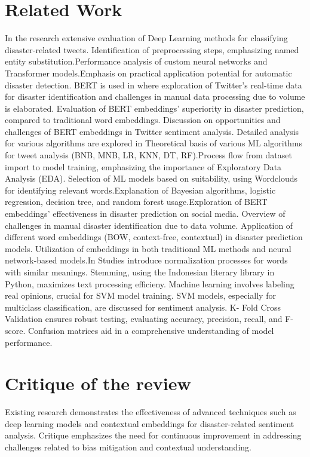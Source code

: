 \section{Related Work} 
In the research \cite{chanda2021efficacy} extensive evaluation of Deep Learning methods for 
classifying disaster-related tweets. Identification of preprocessing steps, emphasizing named 
entity substitution.Performance analysis of custom neural networks and Transformer 
models.Emphasis on practical application potential for automatic disaster detection. BERT is 
used in \cite{deb2022comparative} where exploration of Twitter's real-time data for disaster 
identification and challenges in manual data processing due to volume is elaborated. Evaluation 
of BERT embeddings' superiority in disaster prediction, compared to traditional word 
embeddings. Discussion on opportunities and challenges of BERT embeddings in Twitter sentiment 
analysis. Detailed analysis for various algorithms are explored in 
\cite{fontalis2023comparative} Theoretical basis of various ML algorithms for tweet analysis 
(BNB, MNB, LR, KNN, DT, RF).Process flow from dataset import to model training, emphasizing the 
importance of Exploratory Data Analysis (EDA).
Selection of ML models based on suitability, using Wordclouds for identifying relevant 
words.Explanation of Bayesian algorithms, logistic regression, decision tree, and random forest 
usage.\cite{iparraguirre2023classification}Exploration of BERT embeddings' effectiveness in 
disaster prediction on social media. Overview of challenges in manual disaster identification 
due to data volume. Application of different word embeddings (BOW, context-free, contextual) in 
disaster prediction models.
Utilization of embeddings in both traditional ML methods and neural network-based models.In 
\cite{saddam2023sentiment}Studies introduce normalization processes for words with similar 
meanings. Stemming, using the Indonesian literary library in Python, maximizes text processing 
efficieny. Machine learning involves labeling real opinions, crucial for SVM model training.
SVM models, especially for multiclass classification, are discussed for sentiment analysis. K-
Fold Cross Validation ensures robust testing, evaluating accuracy, precision, recall, and F-
score. Confusion matrices aid in a comprehensive understanding of model performance.

\section{Critique of the review} %
Existing research demonstrates the effectiveness of advanced techniques such as deep learning 
models and contextual embeddings for disaster-related sentiment analysis. Critique emphasizes 
the need for continuous improvement in addressing challenges related to bias mitigation and 
contextual understanding.

